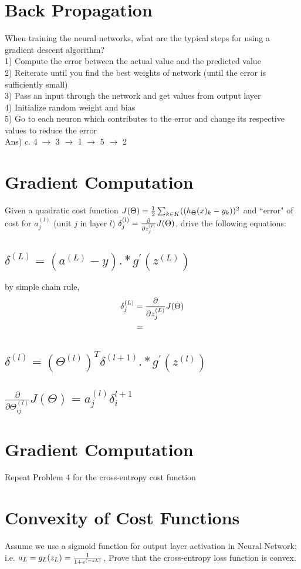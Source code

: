 \documentclass[12pt]{article}%
\begin{document}
\section{Back Propagation}
When training the neural networks, what are the typical steps for using a gradient descent algorithm?\\
1) Compute the error between the actual value and the predicted value\\
2) Reiterate until you find the best weights of network (until the error is sufficiently small)\\
3) Pass an input through the network and get values from output layer\\
4) Initialize random weight and bias\\
5) Go to each neuron which contributes to the error and change its respective values to reduce the error\\

Ans) c. 4 $\rightarrow$ 3 $\rightarrow$ 1 $\rightarrow$ 5 $\rightarrow$ 2

\section{Gradient Computation}
Given a quadratic cost function $J(\Theta) = {1 \over 2} \sum_{k \in K} ((h_\Theta (x)_k - y_k ))^2$ and  ``error" of cost for $a^{(l)}_j$ (unit $j$ in layer $l$) $\delta^{(l)}_j = {\partial \over {\partial z^{(l)}_j}} J(\Theta)$, drive the following equations:
\subsection{$\delta^{(L)} = (a^{(L)} - y).*g^{'}(z^{(L)})$}
by simple chain rule, 
\begin{equation}
	\begin{aligned}
		\delta^{(L)}_j & = {\partial \over {\partial z^{(L)}_j }} J(\Theta) \\
		& = \\
	\end{aligned}
\end{equation}
\subsection{$\delta^{(l)} = (\Theta^{(l)})^{T} \delta^{(l+1)}.*g^{'}(z^{(l)})$}
\subsection{$\frac{\partial}{\partial \Theta_{ij}^{(l)}} J(\Theta) = a_{j}^{(l)} \delta_{i}^{l+1}$}

\section{Gradient Computation}
Repeat Problem 4 for the cross-entropy cost function

\section{Convexity of Cost Functions}
Assume we use a sigmoid function for output layer activation in Neural Network; i.e. $a_L = g_L (z_L ) = {1 \over {1 + e^{(-zL)}}}$, Prove that the cross-entropy loss function is convex.
\end{document}
